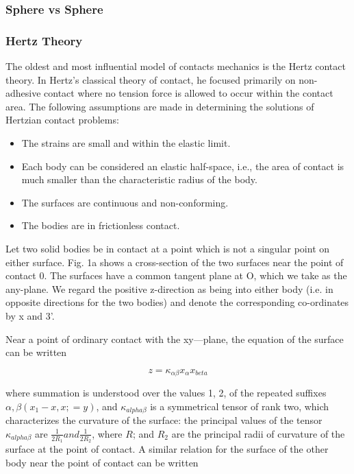 \subsubsection{Sphere vs Sphere}

\subsubsection{Hertz Theory}

The oldest and most influential model of contacts mechanics is the Hertz contact theory. In Hertz’s classical theory of contact, he focused primarily on non-adhesive contact where no tension force is allowed to occur within the contact area. The following assumptions are made in determining the solutions of Hertzian contact problems:

\begin{itemize}
\item The strains are small and within the elastic limit.
\item Each body can be considered an elastic half-space, i.e., the area of contact is much smaller than the characteristic radius of the body.
\item The surfaces are continuous and non-conforming.
\item The bodies are in frictionless contact.
\end{itemize}


Let two solid bodies be in contact at a point which is not a singular point on either surface. Fig. 1a shows a cross-section of the two surfaces near the point of contact 0. The surfaces have a common tangent plane at O, which we take as the any-plane. We regard the positive z-direction as being into either body (i.e. in opposite directions for the two bodies) and denote the corresponding co-ordinates by x and 3'.

Near a point of ordinary contact with the xy—plane, the equation of the surface can be written

\begin{equation}
z = \kappa_{\alpha\beta}x_{\alpha}x_{beta}
\label{eq:contacteq1}
\end{equation}

where summation is understood over the values 1, 2, of the repeated suffixes $\alpha, \beta (x_{1} - x, x; = y)$, and $\kappa_{alpha\beta}$ is a symmetrical tensor of rank two, which characterizes the curvature of the surface: the principal values of the tensor $\kappa_{alpha\beta}$ are $\frac{1}{2R_{1}} and \frac{1}{2R_{2}}$, where $R$; and $R_{2}$ are the principal radii of curvature
of the surface at the point of contact. A similar relation for the surface of the other body near the point of contact can be written


